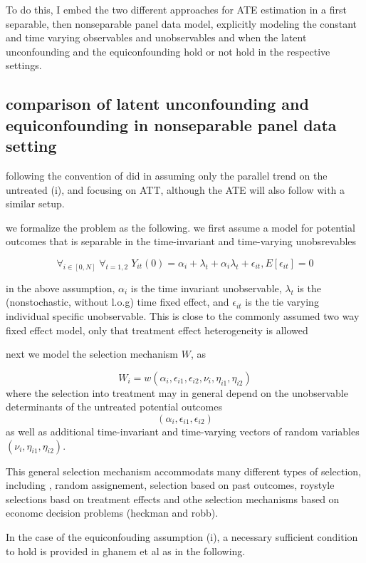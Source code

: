 \documentclass[uplatex,dvipdfmx]{jsarticle}
\begin{document}
To do this, I embed the two different approaches for ATE estimation in a first separable, then nonseparable panel data model, explicitly modeling the constant and time varying observables and unobservables and when the latent unconfounding and the equiconfounding hold or not hold in the respective settings.  





\subsection{comparison of latent unconfounding and equiconfounding in nonseparable panel data setting}

 following the convention of did in assuming only the parallel trend on the untreated (i), and focusing on ATT, although the ATE will also follow with a similar setup.
 
 we formalize the problem as the following.
 we first assume a model for potential outcomes that is separable in the time-invariant and time-varying unobsrevables
\begin{assumption}
    \[\forall_{i\in[0,N]}\;\forall_{t=1,2}\;Y_{it} ( 0) = \alpha_i + \lambda_t + \alpha_i \lambda_t +\epsilon_{it}  , E[ \epsilon_{it} ] = 0\]
\end{assumption}
in the above assumption, $\alpha_i$ is the time invariant unobservable, $\lambda_t$ is the (nonstochastic, without l.o.g) time fixed effect, and $\epsilon_{it} $ is the tie varying individual specific unobservable. This is close to the commonly assumed two way fixed effect model, only that treatment effect heterogeneity is allowed

next we model the selection mechanism $W$, as 

\[W_i = w( \alpha_i, \epsilon_{i1}, \epsilon_{i2}, \nu_i, \eta_{i1}, \eta_{i2} )\]
where the selection into treatment may in general   depend on the unobservable determinants of the untreated potential outcomes
\[(\alpha_i, \epsilon_{i1}, \epsilon_{i2} )\]
as well as additional time-invariant and time-varying vectors of random variables $ (\nu_i, \eta_{i1}, \eta_{i2} )$.

This general selection mechanism accommodats many different types of selection, including , random assignement, selection based on past outcomes, roystyle selections basd on treatment effects and othe selection mechanisms based on economc decision problems (heckman and robb).

In the case of the equiconfouding assumption (i), a necessary sufficient condition to hold is provided in %
{ghanem et al} as in the following.
\end{document}
